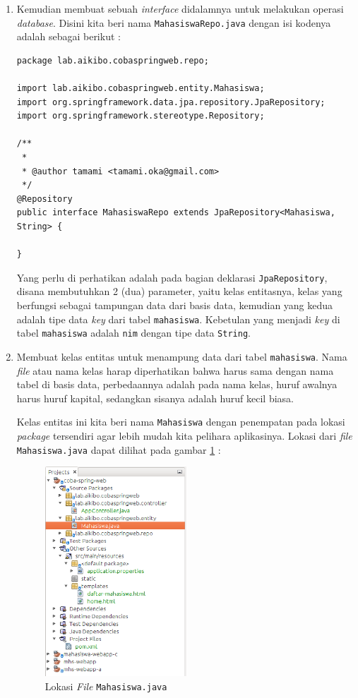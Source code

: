 \begin{enumerate}
	\item Kemudian membuat sebuah \textit{interface} didalamnya untuk melakukan operasi \textit{database}. Disini kita beri nama \texttt{MahasiswaRepo.java} dengan isi kodenya adalah sebagai berikut :
	
	\begin{lstlisting}
package lab.aikibo.cobaspringweb.repo;

import lab.aikibo.cobaspringweb.entity.Mahasiswa;
import org.springframework.data.jpa.repository.JpaRepository;
import org.springframework.stereotype.Repository;

/**
 *
 * @author tamami <tamami.oka@gmail.com>
 */
@Repository
public interface MahasiswaRepo extends JpaRepository<Mahasiswa, String> {
    
}
	\end{lstlisting}
	
	Yang perlu di perhatikan adalah pada bagian deklarasi \texttt{JpaRepository}, disana membutuhkan 2 (dua) parameter, yaitu kelas entitasnya, kelas yang berfungsi sebagai tampungan data dari basis data, kemudian yang kedua adalah tipe data \textit{key} dari tabel \texttt{mahasiswa}. Kebetulan yang menjadi \textit{key} di tabel \texttt{mahasiswa} adalah \texttt{nim} dengan tipe data \texttt{String}.
	
	\item Membuat kelas entitas untuk menampung data dari tabel \texttt{mahasiswa}. Nama \textit{file} atau nama kelas harap diperhatikan bahwa harus sama dengan nama tabel di basis data, perbedaannya adalah pada nama kelas, huruf awalnya harus huruf kapital, sedangkan sisanya adalah huruf kecil biasa.
	
	Kelas entitas ini kita beri nama \texttt{Mahasiswa} dengan penempatan pada lokasi \textit{package} tersendiri agar lebih mudah kita pelihara aplikasinya. Lokasi dari \textit{file} \texttt{Mahasiswa.java} dapat dilihat pada gambar \ref{fig:lokasi-mahasiswa-java} :
	
	\begin{figure}[H]
		\centering
		\includegraphics[width=0.5\textwidth]{./resources/012-lokasi-mahasiswa-java}
		\caption{Lokasi \textit{File} \texttt{Mahasiswa.java}}
		\label{fig:lokasi-mahasiswa-java}
	\end{figure}
	

\end{enumerate}
